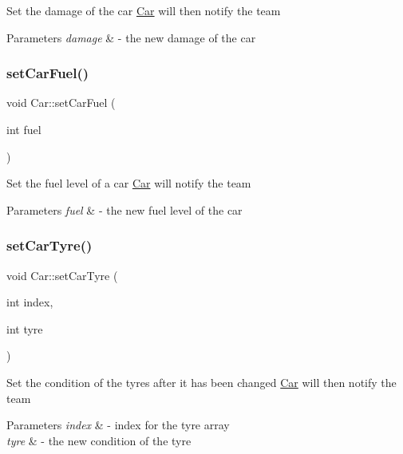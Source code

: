 Set the damage of the car \mbox{\hyperlink{class_car}{Car}} will then notify the team 
\begin{DoxyParams}{Parameters}
{\em damage} & -\/ the new damage of the car \\
\hline
\end{DoxyParams}
\mbox{\label{class_car_a4630826e2d1b4972e9c946faa6c58f19}} 
\subsubsection{\texorpdfstring{set\+Car\+Fuel()}{setCarFuel()}}
{\footnotesize\ttfamily void Car\+::set\+Car\+Fuel (\begin{DoxyParamCaption}\item[{int}]{fuel }\end{DoxyParamCaption})}

Set the fuel level of a car \mbox{\hyperlink{class_car}{Car}} will notify the team 
\begin{DoxyParams}{Parameters}
{\em fuel} & -\/ the new fuel level of the car \\
\hline
\end{DoxyParams}
\mbox{\label{class_car_a87fc66f728b131aeb0748a416984ad93}} 
\subsubsection{\texorpdfstring{set\+Car\+Tyre()}{setCarTyre()}}
{\footnotesize\ttfamily void Car\+::set\+Car\+Tyre (\begin{DoxyParamCaption}\item[{int}]{index,  }\item[{int}]{tyre }\end{DoxyParamCaption})}

Set the condition of the tyres after it has been changed \mbox{\hyperlink{class_car}{Car}} will then notify the team 
\begin{DoxyParams}{Parameters}
{\em index} & -\/ index for the tyre array \\
\hline
{\em tyre} & -\/ the new condition of the tyre \\
\hline
\end{DoxyParams}
\mbox{\label{class_car_a2248a180b5fdb272746f93d7956d11d3}} 
